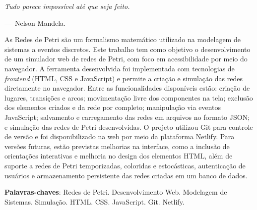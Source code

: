\documentclass[
	12pt,				%
	openright,			%
	oneside,			%
	a4paper,			%
	english,			%
	brazil				%
	]{abntex2}
\begin{document}
\begin{epigrafe}
    \vspace*{\fill}
\epigraph{\textsl{Tudo parece impossível até que seja feito.}}{---~Nelson Mandela.}
\end{epigrafe}


\setlength{\absparsep}{18pt} %
\begin{resumo}
 \noindent
 
 As Redes de Petri são um formalismo matemático utilizado na modelagem de sistemas a eventos discretos. Este trabalho tem como objetivo o desenvolvimento de um simulador web de redes de Petri, com foco em acessibilidade por meio do navegador. A ferramenta desenvolvida foi implementada com tecnologias de \textit{frontend} (HTML, CSS e JavaScript) e permite a criação e simulação das redes diretamente no navegador. Entre as funcionalidades disponíveis estão: criação de lugares, transições e arcos; movimentação livre dos componentes na tela; exclusão dos elementos criados e da rede por completo; manipulação via eventos JavaScript; salvamento e carregamento das redes em arquivos no formato JSON; e simulação das redes de Petri desenvolvidas. O projeto utilizou Git para controle de versão e foi disponibilizado na web por meio da plataforma Netlify. Para versões futuras, estão previstas melhorias na interface, como a inclusão de orientações interativas e melhoria no design dos elementos HTML, além de suporte a redes de Petri temporizadas, coloridas e estocásticas, autenticação de usuários e armazenamento persistente das redes criadas em um banco de dados.

\vspace{\onelineskip}

 \textbf{Palavras-chaves}: Redes de Petri. Desenvolvimento Web. Modelagem de Sistemas. Simulação. HTML. CSS. JavaScript. Git. Netlify.  
\end{resumo}
\end{document}
